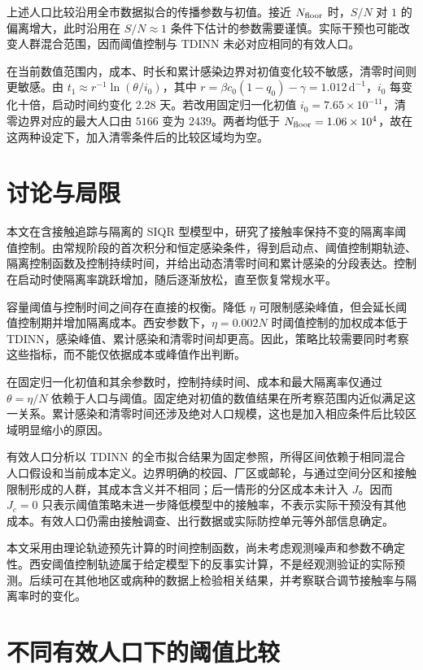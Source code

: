 \documentclass[lang=cn,a4paper,newtx]{elegantpaper}
\numberwithin{equation}{section}
\theoremstyle{plain}
\begin{document}
上述人口比较沿用全市数据拟合的传播参数与初值。接近 $N_{\rm floor}$ 时，$S/N$ 对 $1$ 的偏离增大，此时沿用在 $S/N\approx1$ 条件下估计的参数需要谨慎。实际干预也可能改变人群混合范围，因而阈值控制与 TDINN 未必对应相同的有效人口。

在当前数值范围内，成本、时长和累计感染边界对初值变化较不敏感，清零时间则更敏感。由 $t_1\approx r^{-1}\ln(\theta/i_0)$，其中 $r=\beta c_0(1-q_0)-\gamma=1.012\,\mathrm{d}^{-1}$，$i_0$ 每变化十倍，启动时间约变化 $2.28$ 天。若改用固定归一化初值 $i_0=7.65\times10^{-11}$，清零边界对应的最大人口由 $5166$ 变为 $2439$。两者均低于 $N_{\rm floor}=1.06\times10^4$，故在这两种设定下，加入清零条件后的比较区域均为空。

\section{讨论与局限}
\label{sec:discussion}

本文在含接触追踪与隔离的 SIQR 型模型中，研究了接触率保持不变的隔离率阈值控制。由常规阶段的首次积分和恒定感染条件，得到启动点、阈值控制期轨迹、隔离控制函数及控制持续时间，并给出动态清零时间和累计感染的分段表达。控制在启动时使隔离率跳跃增加，随后逐渐放松，直至恢复常规水平。

容量阈值与控制时间之间存在直接的权衡。降低 $\eta$ 可限制感染峰值，但会延长阈值控制期并增加隔离成本。西安参数下，$\eta=0.002N$ 时阈值控制的加权成本低于 TDINN，感染峰值、累计感染和清零时间却更高。因此，策略比较需要同时考察这些指标，而不能仅依据成本或峰值作出判断。

在固定归一化初值和其余参数时，控制持续时间、成本和最大隔离率仅通过 $\theta=\eta/N$ 依赖于人口与阈值。固定绝对初值的数值结果在所考察范围内近似满足这一关系。累计感染和清零时间还涉及绝对人口规模，这也是加入相应条件后比较区域明显缩小的原因。

有效人口分析以 TDINN 的全市拟合结果为固定参照，所得区间依赖于相同混合人口假设和当前成本定义。边界明确的校园、厂区或邮轮，与通过空间分区和接触限制形成的人群，其成本含义并不相同；后一情形的分区成本未计入 $J$。因而 $J_c=0$ 只表示阈值策略未进一步降低模型中的接触率，不表示实际干预没有其他成本。有效人口仍需由接触调查、出行数据或实际防控单元等外部信息确定。

本文采用由理论轨迹预先计算的时间控制函数，尚未考虑观测噪声和参数不确定性。西安阈值控制轨迹属于给定模型下的反事实计算，不是经观测验证的实际预测。后续可在其他地区或病种的数据上检验相关结果，并考察联合调节接触率与隔离率时的变化。

\clearpage
\appendix
\section{不同有效人口下的阈值比较}
\label{app:panel_eta_N}
\end{document}
